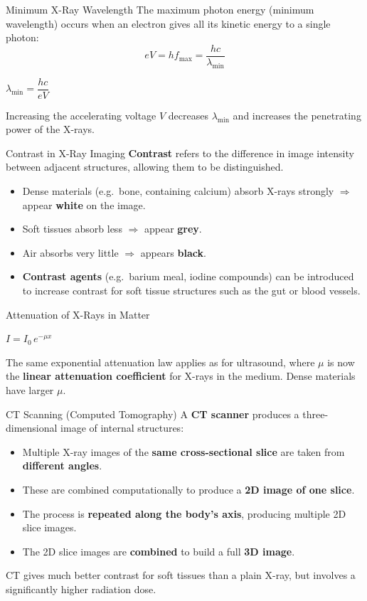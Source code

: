 \begin{formulabox}{Minimum X-Ray Wavelength}
The maximum photon energy (minimum wavelength) occurs when an electron gives all its kinetic energy to a single photon:
$$eV = hf_{\max} = \frac{hc}{\lambda_{\min}}$$
\begin{center}
\Large $\lambda_{\min} = \dfrac{hc}{eV}$
\end{center}
Increasing the accelerating voltage $V$ decreases $\lambda_{\min}$ and increases the penetrating power of the X-rays.
\end{formulabox}

\begin{definitionbox}{Contrast in X-Ray Imaging}
\textbf{Contrast} refers to the difference in image intensity between adjacent structures, allowing them to be distinguished.
\begin{itemize}[itemsep=2pt]
  \item Dense materials (e.g.\ bone, containing calcium) absorb X-rays strongly $\Rightarrow$ appear \textbf{white} on the image.
  \item Soft tissues absorb less $\Rightarrow$ appear \textbf{grey}.
  \item Air absorbs very little $\Rightarrow$ appears \textbf{black}.
  \item \textbf{Contrast agents} (e.g.\ barium meal, iodine compounds) can be introduced to increase contrast for soft tissue structures such as the gut or blood vessels.
\end{itemize}
\end{definitionbox}

\begin{formulabox}{Attenuation of X-Rays in Matter}
\begin{center}
\Large $I = I_0\,e^{-\mu x}$
\end{center}
The same exponential attenuation law applies as for ultrasound, where $\mu$ is now the \textbf{linear attenuation coefficient} for X-rays in the medium. Dense materials have larger $\mu$.
\end{formulabox}

\begin{definitionbox}{CT Scanning (Computed Tomography)}
A \textbf{CT scanner} produces a three-dimensional image of internal structures:
\begin{itemize}[itemsep=3pt]
  \item Multiple X-ray images of the \textbf{same cross-sectional slice} are taken from \textbf{different angles}.
  \item These are combined computationally to produce a \textbf{2D image of one slice}.
  \item The process is \textbf{repeated along the body's axis}, producing multiple 2D slice images.
  \item The 2D slice images are \textbf{combined} to build a full \textbf{3D image}.
\end{itemize}
CT gives much better contrast for soft tissues than a plain X-ray, but involves a significantly higher radiation dose.
\end{definitionbox}

